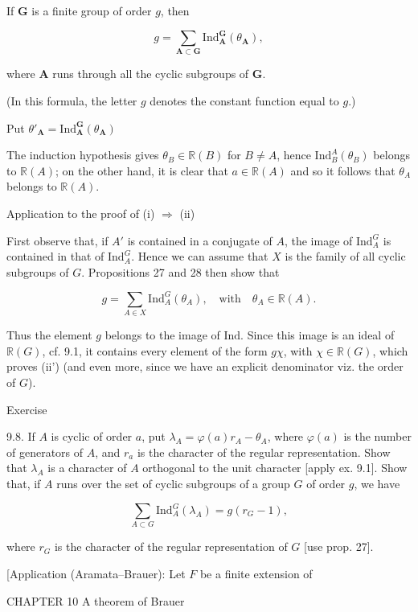 If $\mathbf{G}$ is a finite group of order $g$, then

$$g = \sum_{\mathbf{A} \subset \mathbf{G}} \text{Ind}_{\mathbf{A}}^{\mathbf{G}}(\theta_{\mathbf{A}}),$$

where $\mathbf{A}$ runs through all the cyclic subgroups of $\mathbf{G}$.

(In this formula, the letter $g$ denotes the constant function equal to $g$.)

Put $\theta'_{\mathbf{A}} = \text{Ind}_{\mathbf{A}}^{\mathbf{G}}(\theta_{\mathbf{A}})$

The induction hypothesis gives $\theta_B \in \mathbb{R}(B)$ for $B \neq A$, hence $\text{Ind}_B^A(\theta_B)$ belongs to $\mathbb{R}(A)$; on the other hand, it is clear that $a \in \mathbb{R}(A)$ and so it follows that $\theta_A$ belongs to $\mathbb{R}(A)$.

Application to the proof of (i) $\Rightarrow$ (ii)

First observe that, if $A'$ is contained in a conjugate of $A$, the image of $\text{Ind}_A^G$ is contained in that of $\text{Ind}_A^G$. Hence we can assume that $X$ is the family of all cyclic subgroups of $G$. Propositions 27 and 28 then show that

$$g = \sum_{A \in X} \text{Ind}_A^G(\theta_A), \quad \text{with} \quad \theta_A \in \mathbb{R}(A).$$

Thus the element $g$ belongs to the image of $\text{Ind}$. Since this image is an ideal of $\mathbb{R}(G)$, cf. 9.1, it contains every element of the form $g\chi$, with $\chi \in \mathbb{R}(G)$, which proves (ii') (and even more, since we have an explicit denominator viz. the order of $G$).

Exercise

9.8. If $A$ is cyclic of order $a$, put $\lambda_A = \varphi(a)r_A - \theta_A$, where $\varphi(a)$ is the number of generators of $A$, and $r_a$ is the character of the regular representation. Show that $\lambda_A$ is a character of $A$ orthogonal to the unit character [apply ex. 9.1]. Show that, if $A$ runs over the set of cyclic subgroups of a group $G$ of order $g$, we have

$$\sum_{A \subset G} \text{Ind}_A^G(\lambda_A) = g(r_G - 1),$$

where $r_G$ is the character of the regular representation of $G$ [use prop. 27].

[Application (Aramata–Brauer): Let $F$ be a finite extension of

CHAPTER 10
A theorem of Brauer

